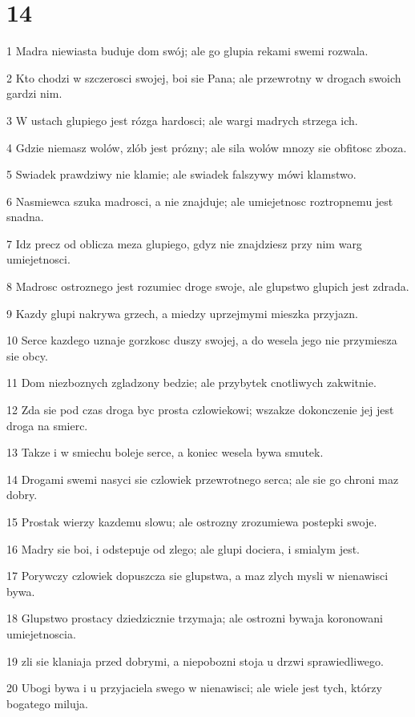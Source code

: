 \chapter{14}

\par 1 Madra niewiasta buduje dom swój; ale go glupia rekami swemi rozwala.
\par 2 Kto chodzi w szczerosci swojej, boi sie Pana; ale przewrotny w drogach swoich gardzi nim.
\par 3 W ustach glupiego jest rózga hardosci; ale wargi madrych strzega ich.
\par 4 Gdzie niemasz wolów, zlób jest prózny; ale sila wolów mnozy sie obfitosc zboza.
\par 5 Swiadek prawdziwy nie klamie; ale swiadek falszywy mówi klamstwo.
\par 6 Nasmiewca szuka madrosci, a nie znajduje; ale umiejetnosc roztropnemu jest snadna.
\par 7 Idz precz od oblicza meza glupiego, gdyz nie znajdziesz przy nim warg umiejetnosci.
\par 8 Madrosc ostroznego jest rozumiec droge swoje, ale glupstwo glupich jest zdrada.
\par 9 Kazdy glupi nakrywa grzech, a miedzy uprzejmymi mieszka przyjazn.
\par 10 Serce kazdego uznaje gorzkosc duszy swojej, a do wesela jego nie przymiesza sie obcy.
\par 11 Dom niezboznych zgladzony bedzie; ale przybytek cnotliwych zakwitnie.
\par 12 Zda sie pod czas droga byc prosta czlowiekowi; wszakze dokonczenie jej jest droga na smierc.
\par 13 Takze i w smiechu boleje serce, a koniec wesela bywa smutek.
\par 14 Drogami swemi nasyci sie czlowiek przewrotnego serca; ale sie go chroni maz dobry.
\par 15 Prostak wierzy kazdemu slowu; ale ostrozny zrozumiewa postepki swoje.
\par 16 Madry sie boi, i odstepuje od zlego; ale glupi dociera, i smialym jest.
\par 17 Porywczy czlowiek dopuszcza sie glupstwa, a maz zlych mysli w nienawisci bywa.
\par 18 Glupstwo prostacy dziedzicznie trzymaja; ale ostrozni bywaja koronowani umiejetnoscia.
\par 19 zli sie klaniaja przed dobrymi, a niepobozni stoja u drzwi sprawiedliwego.
\par 20 Ubogi bywa i u przyjaciela swego w nienawisci; ale wiele jest tych, którzy bogatego miluja.
